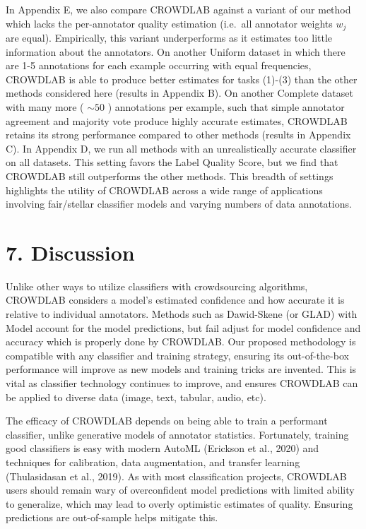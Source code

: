 \documentclass[
]{article}
\begin{document}
In Appendix E, we also compare CROWDLAB against a variant of our method
which lacks the per-annotator quality estimation (i.e.~all annotator
weights \(w_{j}\) are equal). Empirically, this variant underperforms as
it estimates too little information about the annotators. On another
Uniform dataset in which there are 1-5 annotations for each example
occurring with equal frequencies, CROWDLAB is able to produce better
estimates for tasks (1)-(3) than the other methods considered here
(results in Appendix B). On another Complete dataset with many more (
\(\sim 50\) ) annotations per example, such that simple annotator
agreement and majority vote produce highly accurate estimates, CROWDLAB
retains its strong performance compared to other methods (results in
Appendix C). In Appendix D, we run all methods with an unrealistically
accurate classifier on all datasets. This setting favors the Label
Quality Score, but we find that CROWDLAB still outperforms the other
methods. This breadth of settings highlights the utility of CROWDLAB
across a wide range of applications involving fair/stellar classifier
models and varying numbers of data annotations.

\section{7. Discussion}\label{discussion}

Unlike other ways to utilize classifiers with crowdsourcing algorithms,
CROWDLAB considers a model's estimated confidence and how accurate it is
relative to individual annotators. Methods such as Dawid-Skene (or GLAD)
with Model account for the model predictions, but fail adjust for model
confidence and accuracy which is properly done by CROWDLAB. Our proposed
methodology is compatible with any classifier and training strategy,
ensuring its out-of-the-box performance will improve as new models and
training tricks are invented. This is vital as classifier technology
continues to improve, and ensures CROWDLAB can be applied to diverse
data (image, text, tabular, audio, etc).

The efficacy of CROWDLAB depends on being able to train a performant
classifier, unlike generative models of annotator statistics.
Fortunately, training good classifiers is easy with modern AutoML
(Erickson et al., 2020) and techniques for calibration, data
augmentation, and transfer learning (Thulasidasan et al., 2019). As with
most classification projects, CROWDLAB users should remain wary of
overconfident model predictions with limited ability to generalize,
which may lead to overly optimistic estimates of quality. Ensuring
predictions are out-of-sample helps mitigate this.
\end{document}
